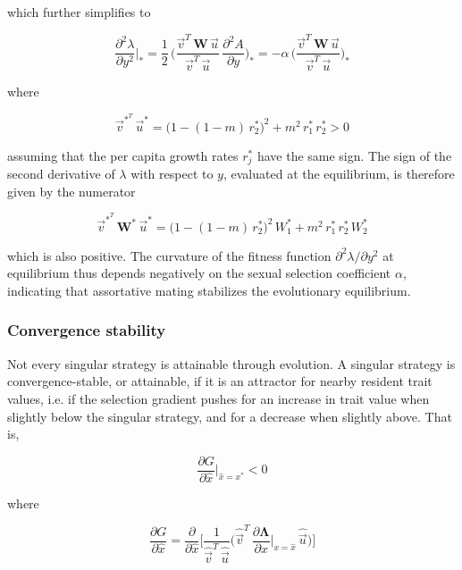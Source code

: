 which further simplifies to

\begin{equation}
    \frac{\partial^2 \lambda}{\partial y^2}\bigg|_* = \frac{1}{2}\,\Bigg(\frac{\overrightarrow{v}^T\,\pmb W\,\overrightarrow{u}}{\overrightarrow{v}^T\,\overrightarrow{u}}\,\frac{\partial^2 A}{\partial y}\Bigg)_* = -\alpha \, \Bigg(\frac{\overrightarrow{v}^T\,\pmb W\,\overrightarrow{u}}{\overrightarrow{v}^T\,\overrightarrow{u}}\Bigg)_*
    \label{eq:curvature_final}
\end{equation}

where 

\begin{equation}
    \overrightarrow{v}^*^T\,\overrightarrow{u}^* = \big(1-(1-m)\,r^*_2\big)^2 + m^2\,r^*_1\,r^*_2 > 0
\end{equation}

assuming that the per capita growth rates $r^*_j$ have the same sign. The sign of the second derivative of $\lambda$ with respect to $y$, evaluated at the equilibrium, is therefore given by the numerator

\begin{equation}
    \overrightarrow{v}^*^T\,\pmb W^*\,\overrightarrow{u}^* = \big(1-(1-m)\,r^*_2\big)^2\,W^*_1 + m^2\,r^*_1\,r^*_2\,W^*_2
\end{equation}

which is also positive. The curvature of the fitness function $\partial^2 \lambda / \partial y^2$ at equilibrium thus depends negatively on the sexual selection coefficient $\alpha$, indicating that assortative mating stabilizes the evolutionary equilibrium.

\subsubsection*{Convergence stability}

Not every singular strategy is attainable through evolution. A singular strategy is convergence-stable, or attainable, if it is an attractor for nearby resident trait values, i.e. if the selection gradient pushes for an increase in trait value when slightly below the singular strategy, and for a decrease when slightly above. That is, 

\begin{equation}
    \frac{\partial G}{\partial \hat{x}}\bigg|_{\hat{x}=x^*} < 0
\end{equation}

where 

\begin{equation}
    \frac{\partial G}{\partial \hat{x}} = \frac{\partial}{\partial \hat{x}} \Bigg[ \frac{1}{\hat{\overrightarrow{v}}^T\,\hat{\overrightarrow{u}}} \bigg( \hat{\overrightarrow{v}}^T\,\frac{\partial \pmb{\Lambda}}{\partial x}\bigg|_{x=\hat{x}}\,\hat{\overrightarrow{u}} \bigg) \Bigg]
\end{equation}

